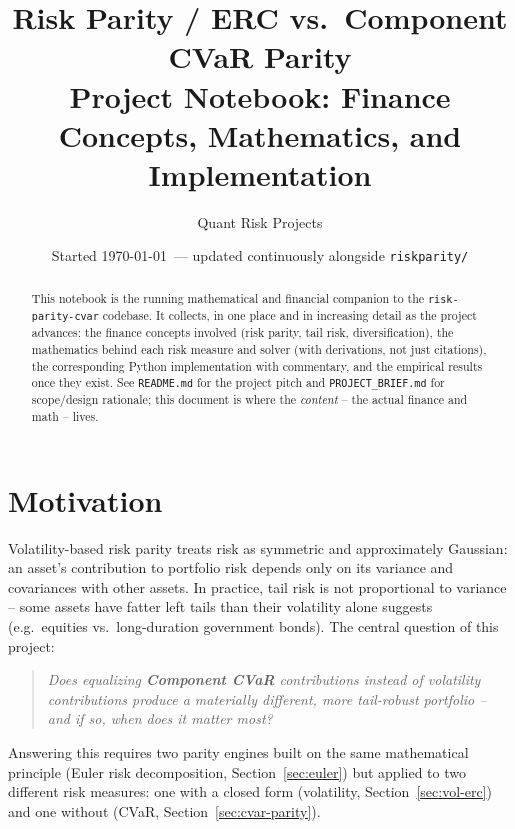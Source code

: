 \documentclass[11pt]{article}
\title{Risk Parity / ERC vs.\ Component CVaR Parity\\[4pt]\large Project Notebook: Finance Concepts, Mathematics, and Implementation}
\author{Quant Risk Projects}
\date{Started \today\ --- updated continuously alongside \texttt{riskparity/}}
\begin{document}
\maketitle

\begin{abstract}
This notebook is the running mathematical and financial companion to the
\texttt{risk-parity-cvar} codebase. It collects, in one place and in
increasing detail as the project advances: the finance concepts involved
(risk parity, tail risk, diversification), the mathematics behind each
risk measure and solver (with derivations, not just citations), the
corresponding Python implementation with commentary, and the empirical
results once they exist. See \texttt{README.md} for the project pitch and
\texttt{PROJECT\_BRIEF.md} for scope/design rationale; this document is
where the \emph{content} -- the actual finance and math -- lives.
\end{abstract}

\tableofcontents

\section{Motivation}

Volatility-based risk parity treats risk as symmetric and approximately
Gaussian: an asset's contribution to portfolio risk depends only on its
variance and covariances with other assets. In practice, tail risk is not
proportional to variance -- some assets have fatter left tails than their
volatility alone suggests (e.g.\ equities vs.\ long-duration government
bonds). The central question of this project:

\begin{quote}
\itshape Does equalizing \textbf{Component CVaR} contributions instead of
volatility contributions produce a materially different, more
tail-robust portfolio -- and if so, when does it matter most?
\end{quote}

Answering this requires two parity engines built on the same mathematical
principle (Euler risk decomposition, Section~\ref{sec:euler}) but applied
to two different risk measures: one with a closed form (volatility,
Section~\ref{sec:vol-erc}) and one without (CVaR,
Section~\ref{sec:cvar-parity}).

\end{document}

